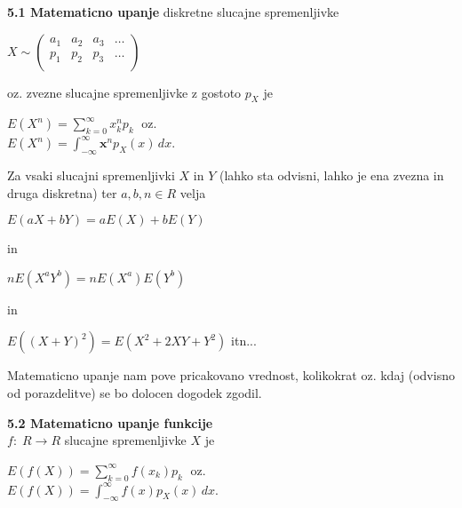 \documentclass{article}
\begin{document}
\begin{multicols}{3}
\textbf{5.1 Matematicno upanje} diskretne slucajne spremenljivke
\begin{center}
    \begin{small}
        \begin{math}
            X \sim
            \begin{pmatrix}
                a_{1} & a_{2} & a_{3} & \dots \\
                p_{1} & p_{2} & p_{3} & \dots \\
            \end{pmatrix}
        \end{math}
    \end{small}
\end{center}
oz. zvezne slucajne spremenljivke z gostoto $p_X$ je
\begin{center}
    \begin{math}
        E(X^n) = \sum_{k=0}^{\infty} x_k^n p_k\;
    \end{math} oz.\\
    \begin{math}
        E(X^n) = \int_{- \infty}^{ \infty} \textbf{x}^n p_X(x)\, dx
    \end{math}.
\end{center}
Za vsaki slucajni spremenljivki $X$ in $Y$ (lahko sta odvisni, lahko je ena zvezna in druga diskretna)
ter $a, b, n \in R$ velja 
\begin{center}
    \begin{math}
        E(aX + bY) = aE(X) + bE(Y)
    \end{math}
\end{center} in
\begin{center}
    \begin{math}
        nE(X^a Y^b) = nE(X^a) E(Y^b)
    \end{math}
\end{center} in
\begin{center}
    \begin{math}
        E((X + Y)^2) = E(X^2 + 2XY + Y^2)
    \end{math} itn...
\end{center}
Matematicno upanje nam pove pricakovano vrednost, kolikokrat oz. kdaj (odvisno od porazdelitve) 
se bo dolocen dogodek zgodil. 

\textbf{5.2 Matematicno upanje funkcije}\\
$f:\; R \rightarrow R$ slucajne spremenljivke $X$ je
\begin{center}
    \begin{math}
        E(f(X)) = \sum_{k=0}^{\infty} f(x_k) p_k\;
    \end{math} oz.\\
    \begin{math}
        E(f(X)) = \int_{- \infty}^{ \infty} f(x) p_X (x)\, dx
    \end{math}.
\end{center}


\end{multicols}
\end{document}
